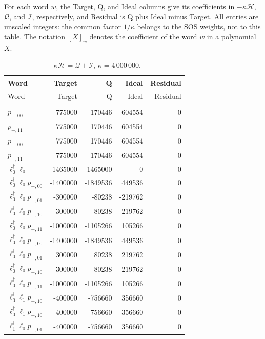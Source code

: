 For each word $w$, the Target, Q, and Ideal columns give its coefficients
in $-\kappa\mathcal H$, $\mathcal Q$, and $\mathcal I$, respectively, and
Residual is Q plus Ideal minus Target. All entries are unscaled integers:
the common factor $1/\kappa$ belongs to the SOS weights, not to this table.
The notation $[X]_w$ denotes the coefficient of the word $w$ in a
polynomial $X$.
\begingroup
\small
\setlength{\tabcolsep}{7pt}
\renewcommand{\arraystretch}{1.02}
\begin{longtable}{@{}lrrrr@{}}
\caption{$-\kappa\mathcal H=\mathcal Q+\mathcal I$, $\kappa=4\,000\,000$.}
\label{tab:hall-sos-coefficients}\\
\toprule
Word & Target & Q & Ideal & Residual \\
\midrule
\endfirsthead
\toprule
Word & Target & Q & Ideal & Residual \\
\midrule
\endhead
\bottomrule
\endfoot
\multicolumn{5}{l}{$[\mathcal H]_w\ne0$}\\
\midrule
$p_{+,00}$ & 775000 & 170446 & 604554 & 0 \\
$p_{+,11}$ & 775000 & 170446 & 604554 & 0 \\
$p_{-,00}$ & 775000 & 170446 & 604554 & 0 \\
$p_{-,11}$ & 775000 & 170446 & 604554 & 0 \\
$\ell_{0}^\dagger \ell_{0}$ & 1465000 & 1465000 & 0 & 0 \\
$\ell_{0}^\dagger \ell_{0} p_{+,00}$ & -1400000 & -1849536 & 449536 & 0 \\
$\ell_{0}^\dagger \ell_{0} p_{+,01}$ & -300000 & -80238 & -219762 & 0 \\
$\ell_{0}^\dagger \ell_{0} p_{+,10}$ & -300000 & -80238 & -219762 & 0 \\
$\ell_{0}^\dagger \ell_{0} p_{+,11}$ & -1000000 & -1105266 & 105266 & 0 \\
$\ell_{0}^\dagger \ell_{0} p_{-,00}$ & -1400000 & -1849536 & 449536 & 0 \\
$\ell_{0}^\dagger \ell_{0} p_{-,01}$ & 300000 & 80238 & 219762 & 0 \\
$\ell_{0}^\dagger \ell_{0} p_{-,10}$ & 300000 & 80238 & 219762 & 0 \\
$\ell_{0}^\dagger \ell_{0} p_{-,11}$ & -1000000 & -1105266 & 105266 & 0 \\
$\ell_{0}^\dagger \ell_{1} p_{+,10}$ & -400000 & -756660 & 356660 & 0 \\
$\ell_{0}^\dagger \ell_{1} p_{-,10}$ & -400000 & -756660 & 356660 & 0 \\
$\ell_{1}^\dagger \ell_{0} p_{+,01}$ & -400000 & -756660 & 356660 & 0 \\

\end{longtable}
